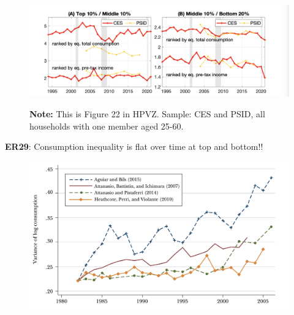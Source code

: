\documentclass[11pt, aspectratio=169]{beamer}
\begin{document}
\begin{frame}{}
	\begin{figure}
		\includegraphics[scale=0.4]{./figures/inequality_consumption_0}
	\vspace*{-2mm}
	\begin{flushleft}
		{\scriptsize \hspace{6mm} \textbf{Note:} This is Figure 22 in HPVZ. Sample: CES and PSID, all households with one member aged 25-60.}
	\end{flushleft}	
	\end{figure}

	\vspace{0mm}
	{\color{blue}\textbf{ER29}}: Consumption inequality is flat over time at top and bottom!!
\end{frame}


\begin{frame}{}
	\begin{figure}
		\includegraphics[scale=0.4]{./figures/inequality_consumption_3}
	\end{figure}
\end{frame}
\end{document}
